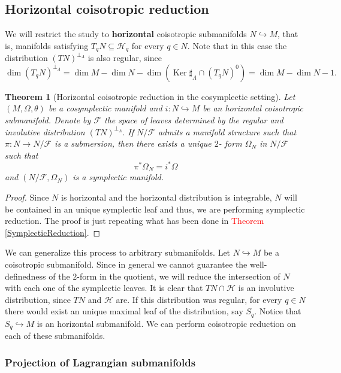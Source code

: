 \documentclass[12pt]{article}
\newtheorem{theorem}{Theorem}[section]
\renewcommand{\dim}{\operatorname{dim}}
\renewcommand{\ker}{\operatorname{Ker}}
\begin{document}
\subsection{Horizontal coisotropic reduction}
We will restrict the study to \textbf{horizontal} coisotropic submanifolds $N\hookrightarrow M$, that is, manifolds satisfying $T_qN \subseteq \mathcal{H}_q$ for every $q\in N$. Note that in this case the distribution $(TN)^{\perp_\Lambda}$ is also regular, since $$\dim (T_qN)^{\perp_\Lambda} = \dim M - \dim N - \dim (\ker \sharp_\Lambda\cap (T_qN)^0)= \dim M - \dim N - 1.$$

\begin{theorem}[Horizontal coisotropic reduction in the cosymplectic setting] Let $(M, \Omega, \theta)$ be a cosymplectic manifold and $i: N \hookrightarrow M$ be an horizontal coisotropic submanifold. Denote by $\mathcal{F}$ the space of leaves determined by the regular and involutive distribution $(TN)^{\perp_\Lambda}.$ If $N/ \mathcal{F}$ admits a manifold structure such that $\pi : N \rightarrow N/ \mathcal{F}$ is a submersion, then there exists a unique $2$- form $\Omega_N$ in $N/\mathcal{F}$ such that $$\pi^* \Omega_N = i^* \Omega$$and  $(N/\mathcal{F}, \Omega_N)$ is a symplectic manifold. 
\end{theorem}
\begin{proof} Since $N$ is horizontal and the horizontal distribution is integrable, $N$ will be contained in an unique symplectic leaf and thus, we are performing symplectic reduction. The proof is just repeating what has been done in \textcolor{red}{Theorem \ref{SymplecticReduction}}.
\end{proof}

We can generalize this process to arbitrary submanifolds. Let $N \hookrightarrow M$ be a coisotropic submanifold. Since in general we cannot guarantee the well-definedness of the $2$-form in the quotient, we will reduce the intersection of $N$ with each one of the symplectic leaves. It is clear that $TN\cap \mathcal{H}$ is an involutive distribution, since $TN$ and $\mathcal{H}$ are. If this distribution was regular,  for every $q \in N$ there would exist an unique maximal leaf of the distribution, say $S_q$. Notice that $S_q \hookrightarrow M$ is an horizontal submanifold. We can perform coisotropic reduction on each of these submanifolds.

\subsubsection{Projection of Lagrangian submanifolds}
\end{document}
